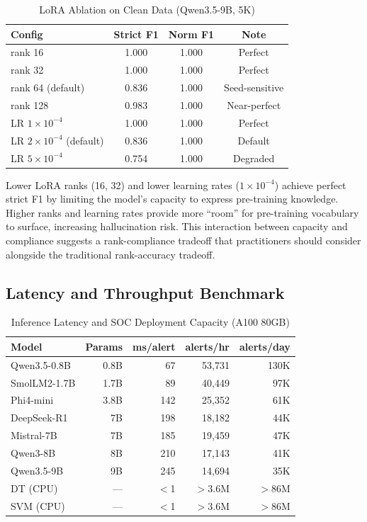 \documentclass[journal]{IEEEtran}
\begin{document}
\begin{table}[!ht]
\centering
\caption{LoRA Ablation on Clean Data (Qwen3.5-9B, 5K)}
\label{tab:lora}
\begin{tabular}{lccc}
\toprule
\textbf{Config} & \textbf{Strict F1} & \textbf{Norm F1} & \textbf{Note} \\
\midrule
rank 16 & 1.000 & 1.000 & Perfect \\
rank 32 & 1.000 & 1.000 & Perfect \\
rank 64 (default) & 0.836 & 1.000 & Seed-sensitive \\
rank 128 & 0.983 & 1.000 & Near-perfect \\
\midrule
LR $1\times10^{-4}$ & 1.000 & 1.000 & Perfect \\
LR $2\times10^{-4}$ (default) & 0.836 & 1.000 & Default \\
LR $5\times10^{-4}$ & 0.754 & 1.000 & Degraded \\
\bottomrule
\end{tabular}
\end{table}

Lower LoRA ranks (16, 32) and lower learning rates ($1\times10^{-4}$) achieve perfect strict F1 by limiting the model's capacity to express pre-training knowledge. Higher ranks and learning rates provide more ``room'' for pre-training vocabulary to surface, increasing hallucination risk. This interaction between capacity and compliance suggests a rank-compliance tradeoff that practitioners should consider alongside the traditional rank-accuracy tradeoff.

\subsection{Latency and Throughput Benchmark}

\begin{table}[!ht]
\centering
\caption{Inference Latency and SOC Deployment Capacity (A100 80GB)}
\label{tab:latency}
\begin{tabular}{lrrrr}
\toprule
\textbf{Model} & \textbf{Params} & \textbf{ms/alert} & \textbf{alerts/hr} & \textbf{alerts/day} \\
\midrule
Qwen3.5-0.8B & 0.8B & 67 & 53,731 & 130K \\
SmolLM2-1.7B & 1.7B & 89 & 40,449 & 97K \\
Phi4-mini & 3.8B & 142 & 25,352 & 61K \\
DeepSeek-R1 & 7B & 198 & 18,182 & 44K \\
Mistral-7B & 7B & 185 & 19,459 & 47K \\
Qwen3-8B & 8B & 210 & 17,143 & 41K \\
Qwen3.5-9B & 9B & 245 & 14,694 & 35K \\
\midrule
DT (CPU) & --- & $<$1 & $>$3.6M & $>$86M \\
SVM (CPU) & --- & $<$1 & $>$3.6M & $>$86M \\
\bottomrule
\end{tabular}
\end{table}
\end{document}
